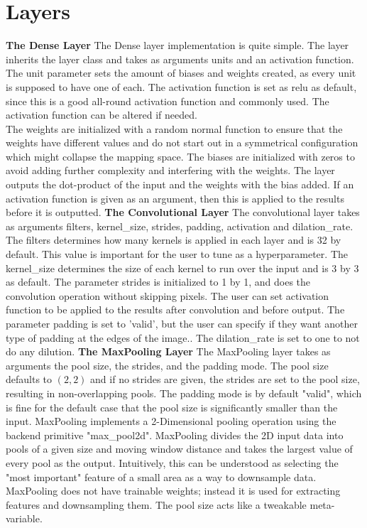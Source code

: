 \section{Layers}

\textbf{The Dense Layer}
\newline
The Dense layer implementation is quite simple. The layer inherits the layer class and takes as arguments units and an activation function. The unit parameter sets the amount of biases and weights created, as every unit is supposed to have one of each.  The activation function is set as relu as default, since this is a good all-round activation function and commonly used.  The activation function can be altered if needed.  \\
The weights are initialized with a random normal function to ensure that the weights have different values and do not start out in a symmetrical configuration which might collapse the mapping space.  The biases are initialized with zeros to avoid adding further complexity and interfering with the weights. The layer outputs the dot-product of the input and the weights with the bias added. If an activation function is given as an argument, then this is applied to the results before it is outputted.
\newline
\newline
\textbf{The Convolutional Layer}
\newline
The convolutional layer takes as arguments filters, kernel\_size, strides, padding, activation and dilation\_rate. The filters determines how many kernels is applied in each layer and is 32 by default. This value is important for the user to tune as a hyperparameter. The kernel\_size determines the size of each kernel to run over the input and is 3 by 3 as default. The parameter strides is initialized to 1 by 1, and does the convolution operation without skipping pixels. The user can set activation function to be applied to the results after convolution and before output. The parameter padding is set to 'valid',  but the user can specify if they want another type of padding at the edges of the image.. The dilation\_rate is set to one to not do any dilution. 
\newline
\newline
\textbf{The MaxPooling Layer}
\newline
The MaxPooling layer takes as arguments the pool size, the strides, and the padding mode. The pool size defaults to $(2, 2)$ and if no strides are given, the strides are set to the pool size, resulting in non-overlapping pools. The padding mode is by default "valid", which is fine for the default case that the pool size is significantly smaller than the input. MaxPooling implements a 2-Dimensional pooling operation using the backend primitive "max\_pool2d". MaxPooling divides the 2D input data into pools of a given size and moving window distance and takes the largest value of every pool as the output. Intuitively, this can be understood as selecting the "most important" feature of a small area as a way to downsample data. MaxPooling does not have trainable weights; instead it is used for extracting features and downsampling them. The pool size acts like a tweakable meta-variable.
